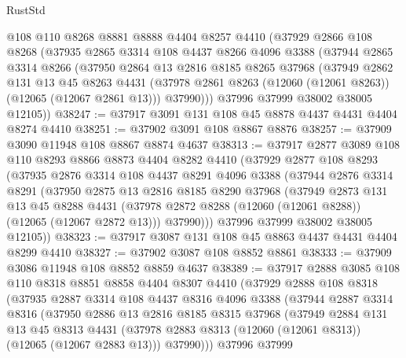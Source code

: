 \begin{lexlean}{RustStd}
\begin{coremodule}
    @108
    @110
    @8268
    @8881
    @8888
    @4404
    @8257
    @4410
    (@37929
      @2866
      @108
      @8268
      (@37935
        @2865
        @3314
        @108
        @4437
        @8266
        @4096
        @3388
        (@37944
          @2865
          @3314
          @8266
          (@37950
            @2864
            @13
            @2816
            @8185
            @8265
            @37968
            (@37949
              @2862
              @131
              @13
              @45
              @8263
              @4431
              (@37978 @2861 @8263 (@12060 (@12061 @8263)) (@12065 (@12067 @2861 @13)))
              @37990)))
        @37996
        @37999
        @38002
        @38005
        @12105))
@38247 := @37917 @3091 @131 @108 @45 @8878 @4437 @4431 @4404 @8274 @4410
@38251 := @37902 @3091 @108 @8867 @8876
@38257 := @37909 @3090 @11948 @108 @8867 @8874 @4637
@38313 := @37917
    @2877
    @3089
    @108
    @110
    @8293
    @8866
    @8873
    @4404
    @8282
    @4410
    (@37929
      @2877
      @108
      @8293
      (@37935
        @2876
        @3314
        @108
        @4437
        @8291
        @4096
        @3388
        (@37944
          @2876
          @3314
          @8291
          (@37950
            @2875
            @13
            @2816
            @8185
            @8290
            @37968
            (@37949
              @2873
              @131
              @13
              @45
              @8288
              @4431
              (@37978 @2872 @8288 (@12060 (@12061 @8288)) (@12065 (@12067 @2872 @13)))
              @37990)))
        @37996
        @37999
        @38002
        @38005
        @12105))
@38323 := @37917 @3087 @131 @108 @45 @8863 @4437 @4431 @4404 @8299 @4410
@38327 := @37902 @3087 @108 @8852 @8861
@38333 := @37909 @3086 @11948 @108 @8852 @8859 @4637
@38389 := @37917
    @2888
    @3085
    @108
    @110
    @8318
    @8851
    @8858
    @4404
    @8307
    @4410
    (@37929
      @2888
      @108
      @8318
      (@37935
        @2887
        @3314
        @108
        @4437
        @8316
        @4096
        @3388
        (@37944
          @2887
          @3314
          @8316
          (@37950
            @2886
            @13
            @2816
            @8185
            @8315
            @37968
            (@37949
              @2884
              @131
              @13
              @45
              @8313
              @4431
              (@37978 @2883 @8313 (@12060 (@12061 @8313)) (@12065 (@12067 @2883 @13)))
              @37990)))
        @37996
        @37999

\end{coremodule}
\end{lexlean}
